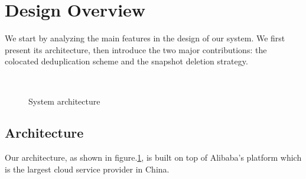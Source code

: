 \section{Design Overview}
\label{sect:design}
We start by analyzing the main features in the design of our system.
We first present its architecture,
then introduce the two major contributions: the colocated deduplication 
scheme and the snapshot deletion strategy.

\begin{figure}
    \centering
    \\
    \caption{System architecture}
    \label{fig:arch}
\end{figure}

\subsection{Architecture}
\label{sect:arch}
Our architecture, as shown in figure.\ref{fig:arch}, is built on top of 
Alibaba's platform which is the largest cloud service provider in China. 

